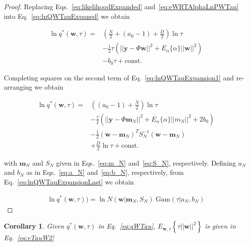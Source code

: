 \documentclass[12pt]{article}
\newtheorem{corollaryETauWTW}{Corollary}[lemmaQWTau]
\newlength\mystoreparindent
\newenvironment{myparindent}[1]{%
\setlength{\mystoreparindent}{\the\parindent}
\setlength{\parindent}{#1}
}{%
\setlength{\parindent}{\mystoreparindent}
}
\begin{document}
\begin{myparindent}{0pt}
\begin{proof}
Replacing Eqs.~\ref{eq:likelihoodExpanded} and~\ref{eq:eWRTAlphaLnPWTau} into
Eq.~\ref{eq:lnQWTauExpaned} we obtain

\begin{align}
 \ln q^*(\mathbf{w},\tau)=&\left(\frac{N}{2}+(a_0-1)+\frac{D}{2}\right)\ln\tau\nonumber\\
                          &-\frac{1}{2}\tau\left(||\mathbf{y}-\Phi\mathbf{w}||^2+E_\alpha\{\alpha\}||\mathbf{w}||^2\right)\nonumber\\
                          &-b_0\tau + \text{const.}\label{eq:lnQWTauExpansion1}
\end{align}

Completing squares on the second term of Eq.~\ref{eq:lnQWTauExpansion1} and
re-arranging we obtain

\begin{align}
\ln q^*(\mathbf{w},\tau)={}&\left((a_0-1)+\frac{N}{2}\right)\ln\tau\nonumber\\
&-\frac{\tau}{2}\left(||\mathbf{y}-\Phi\mathbf{m}_N||^2+E_\alpha\{\alpha\}||m_N||^2+2b_0\right)\nonumber\\
&-\frac{1}{2}(\mathbf{w}-\mathbf{m}_N)^TS_N^{-1}(\mathbf{w}-\mathbf{m}_N)\nonumber\\
&+\frac{D}{2}\ln\tau+\text{const.}\label{eq:lnQWTauExpansionLast}
\end{align}

with $\mathbf{m}_N$ and $S_N$ given in Eqs.~\ref{eq:m_N}
and~\ref{eq:S_N}, respectively. Defining $a_N$ and $b_N$ as in
Eqs.~\ref{eq:a_N} and~\ref{eq:b_N}, respectively, from
Eq.~\ref{eq:lnQWTauExpansionLast} we obtain

\begin{align}
\ln q^*(\mathbf{w},\tau))=\ln N(\mathbf{w}|\mathbf{m}_N,S_N)\;\text{Gam}(\tau|a_N,b_N)\nonumber
\end{align}

\end{proof}
\end{myparindent}

\begin{corollaryETauWTW}
Given $q^*(\mathbf{w},\tau)$ in Eq.~\ref{eq:qWTau},
$E_{\mathbf{w},\tau}\left\{\tau||\mathbf{w}||^2\right\}$ is given in
Eq.~\ref{eq:eTauW2}
\label{corollary:eTauWTW}
\end{corollaryETauWTW}
\end{document}
